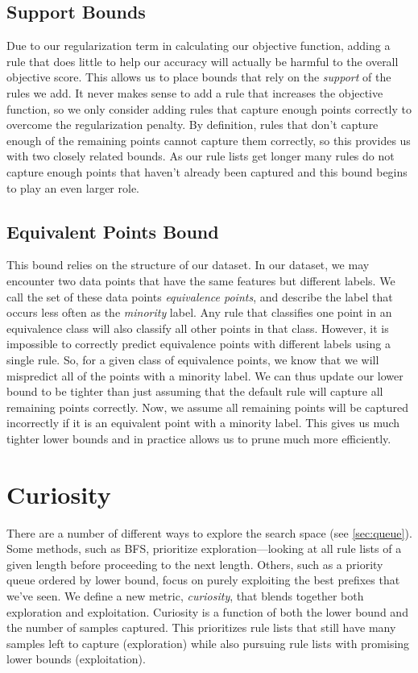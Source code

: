 \documentclass[]{report}
\theoremstyle{definition}
\begin{document}
\subsection{Support Bounds}
Due to our regularization term in calculating our objective function, adding a rule that does little to help our accuracy will actually be harmful to the overall objective score.
This allows us to place bounds that rely on the \textit{support} of the rules we add.
It never makes sense to add a rule that increases the objective function, so we only consider adding rules that capture enough points correctly to overcome the regularization penalty.
By definition, rules that don't capture enough of the remaining points cannot capture them correctly, so this provides us with two closely related bounds.
As our rule lists get longer many rules do not capture enough points that haven't already been captured and this bound begins to play an even larger role.

\subsection{Equivalent Points Bound}
This bound relies on the structure of our dataset.
In our dataset, we may encounter two data points that have the same features but different labels.
We call the set of these data points \textit{equivalence points}, and describe the label that occurs less often as the \textit{minority} label.
Any rule that classifies one point in an equivalence class will also classify all other points in that class.
However, it is impossible to correctly predict equivalence points with different labels using a single rule.
So, for a given class of equivalence points, we know that we will mispredict all of the points with a minority label.
We can thus update our lower bound to be tighter than just assuming that the default rule will capture all remaining points correctly.
Now, we assume all remaining points will be captured incorrectly if it is an equivalent point with a minority label.
This gives us much tighter lower bounds and in practice allows us to prune much more efficiently.

\section{Curiosity}
There are a number of different ways to explore the search space (see \ref{sec:queue}).
Some methods, such as BFS, prioritize exploration---looking at all rule lists of a given length before proceeding to the next length.
Others, such as a priority queue ordered by lower bound, focus on purely exploiting the best prefixes that we've seen.
We define a new metric, \textit{curiosity}, that blends together both exploration and exploitation.
Curiosity is a function of both the lower bound and the number of samples captured.
This prioritizes rule lists that still have many samples left to capture (exploration) while also pursuing rule lists with promising lower bounds (exploitation).
\end{document}
